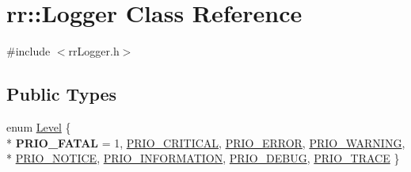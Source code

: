 \hypertarget{classrr_1_1_logger}{\section{rr\-:\-:Logger Class Reference}
\label{classrr_1_1_logger}
}


{\ttfamily \#include $<$rr\-Logger.\-h$>$}

\subsection*{Public Types}
\begin{DoxyCompactItemize}
\item 
enum \hyperlink{classrr_1_1_logger_a72a52e7fe7be48e2ecad639c641ee8aa}{Level} \{ \\*
{\bfseries P\-R\-I\-O\-\_\-\-F\-A\-T\-A\-L} = 1, 
\hyperlink{classrr_1_1_logger_a72a52e7fe7be48e2ecad639c641ee8aaaa0d875a803223fc9061d0e4589a18669}{P\-R\-I\-O\-\_\-\-C\-R\-I\-T\-I\-C\-A\-L}, 
\hyperlink{classrr_1_1_logger_a72a52e7fe7be48e2ecad639c641ee8aaa50eddb13757870a9c9570b30fcbe9319}{P\-R\-I\-O\-\_\-\-E\-R\-R\-O\-R}, 
\hyperlink{classrr_1_1_logger_a72a52e7fe7be48e2ecad639c641ee8aaa8ffbde13127a59aee643a16d17dd0083}{P\-R\-I\-O\-\_\-\-W\-A\-R\-N\-I\-N\-G}, 
\\*
\hyperlink{classrr_1_1_logger_a72a52e7fe7be48e2ecad639c641ee8aaa85a68da3830516a9816488da87566487}{P\-R\-I\-O\-\_\-\-N\-O\-T\-I\-C\-E}, 
\hyperlink{classrr_1_1_logger_a72a52e7fe7be48e2ecad639c641ee8aaaaeb7007916eb4437f53b8fb7c1a5d965}{P\-R\-I\-O\-\_\-\-I\-N\-F\-O\-R\-M\-A\-T\-I\-O\-N}, 
\hyperlink{classrr_1_1_logger_a72a52e7fe7be48e2ecad639c641ee8aaa9015921cf74ca04bd31ea75e9f9d0827}{P\-R\-I\-O\-\_\-\-D\-E\-B\-U\-G}, 
\hyperlink{classrr_1_1_logger_a72a52e7fe7be48e2ecad639c641ee8aaa3bb1c3906f3c5947822a1a8566f7fe77}{P\-R\-I\-O\-\_\-\-T\-R\-A\-C\-E}
 \}
\end{DoxyCompactItemize}
